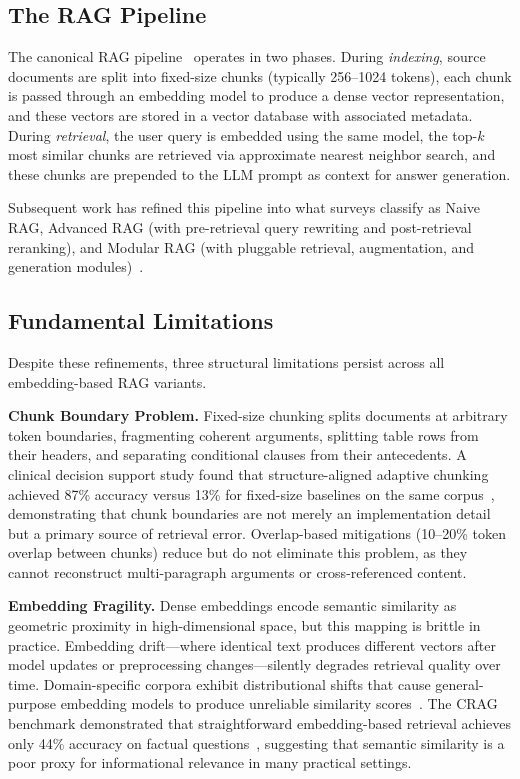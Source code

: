 \documentclass[conference]{IEEEtran}
\begin{document}
\subsection{The RAG Pipeline}

The canonical RAG pipeline~\cite{lewis2020rag} operates in two phases. During \textit{indexing}, source documents are split into fixed-size chunks (typically 256--1024 tokens), each chunk is passed through an embedding model to produce a dense vector representation, and these vectors are stored in a vector database with associated metadata. During \textit{retrieval}, the user query is embedded using the same model, the top-$k$ most similar chunks are retrieved via approximate nearest neighbor search, and these chunks are prepended to the LLM prompt as context for answer generation.

Subsequent work has refined this pipeline into what surveys classify as Naive RAG, Advanced RAG (with pre-retrieval query rewriting and post-retrieval reranking), and Modular RAG (with pluggable retrieval, augmentation, and generation modules)~\cite{gao2024ragsurvey, ranjan2024ragsurvey}.

\subsection{Fundamental Limitations}

Despite these refinements, three structural limitations persist across all embedding-based RAG variants.

\textbf{Chunk Boundary Problem.} Fixed-size chunking splits documents at arbitrary token boundaries, fragmenting coherent arguments, splitting table rows from their headers, and separating conditional clauses from their antecedents. A clinical decision support study found that structure-aligned adaptive chunking achieved 87\% accuracy versus 13\% for fixed-size baselines on the same corpus~\cite{chunking2025clinical}, demonstrating that chunk boundaries are not merely an implementation detail but a primary source of retrieval error. Overlap-based mitigations (10--20\% token overlap between chunks) reduce but do not eliminate this problem, as they cannot reconstruct multi-paragraph arguments or cross-referenced content.

\textbf{Embedding Fragility.} Dense embeddings encode semantic similarity as geometric proximity in high-dimensional space, but this mapping is brittle in practice. Embedding drift---where identical text produces different vectors after model updates or preprocessing changes---silently degrades retrieval quality over time. Domain-specific corpora exhibit distributional shifts that cause general-purpose embedding models to produce unreliable similarity scores~\cite{sharma2025ragsurvey}. The CRAG benchmark demonstrated that straightforward embedding-based retrieval achieves only 44\% accuracy on factual questions~\cite{yang2024crag}, suggesting that semantic similarity is a poor proxy for informational relevance in many practical settings.
\end{document}
